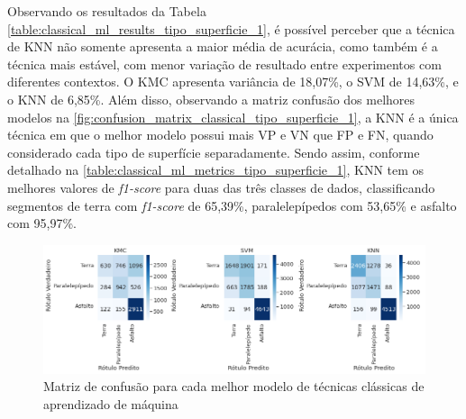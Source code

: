 Observando os resultados da Tabela \ref{table:classical_ml_results_tipo_superficie_1}, é possível perceber que a técnica de KNN não somente apresenta a maior média de acurácia, como também é a técnica mais estável, com menor variação de resultado entre experimentos com diferentes contextos. O KMC apresenta variância de 18,07\%, o SVM de 14,63\%, e o KNN de 6,85\%. Além disso, observando a matriz confusão dos melhores modelos na \autoref{fig:confusion_matrix_classical_tipo_superficie_1}, a KNN é a única técnica em que o melhor modelo possui mais VP e VN que FP e FN, quando considerado cada tipo de superfície separadamente. Sendo assim, conforme detalhado na \autoref{table:classical_ml_metrics_tipo_superficie_1}, KNN tem os melhores valores de \textit{f1-score} para duas das três classes de dados, classificando segmentos de terra com \textit{f1-score} de 65,39\%, paralelepípedos com 53,65\% e asfalto com 95,97\%. 

\begin{figure}[H]
  \centering
  \caption{Matriz de confusão para cada melhor modelo de técnicas clássicas de aprendizado de máquina}
  \label{fig:confusion_matrix_classical_tipo_superficie_1}
  \includegraphics[width=1\textwidth]{figuras/fig_34.png}
\end{figure}


